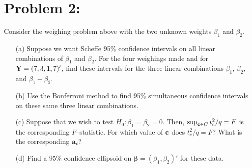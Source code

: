 \documentclass[11pt]{article}
\begin{document}
\section*{Problem 2:}  Consider the weighing problem above with the two unknown weights $\beta_1$ and $\beta_2$.
\begin{itemize}
\item[(a)]  Suppose we want Scheffe 95$\%$ confidence intervals on all linear combinations of $\beta_1$ and $\beta_2$.  For the four weighings made and for ${\bf Y} = (7,3,1,7)'$, find these intervals for the three linear combinations $\beta_1$, $\beta_2$, and $\beta_1 - \beta_2$. 
\item[(b)] Use the Bonferroni method to find 95$\%$ simultaneous confidence intervals on these same three linear combinations.
\item[(c)]  Suppose that we wish to test $H_0\colon \beta_1 = \beta_2 = 0$.  Then, $\sup_{{\bf c}\in C} t^2_c / q = F$ is the corresponding $F$--statistic.  For which value of ${\bf c}$ does $t^2_c/q = F$?  What is the corresponding ${\bf a}_c?$
\item[(d)]  Find a 95$\%$ confidence ellipsoid on $\boldsymbol\beta = (\beta_1,\beta_2)'$ for these data.
\end{itemize}
\end{document}
